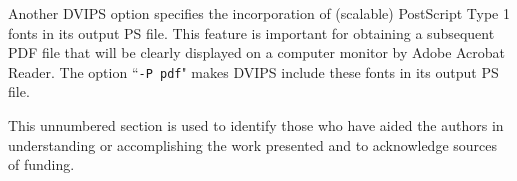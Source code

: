 \documentclass[]{spie}  %
\begin{document}
Another DVIPS option specifies the incorporation of (scalable) PostScript Type 1 fonts in its output PS file. This feature is important for obtaining a subsequent PDF file that will be clearly displayed on a computer monitor by Adobe Acrobat Reader.  The option ``{\tt -P pdf}" makes DVIPS include these fonts in its output PS file.

\acknowledgments     %
 
This unnumbered section is used to identify those who have aided the authors in understanding or accomplishing the work presented and to acknowledge sources of funding.  


\end{document}
